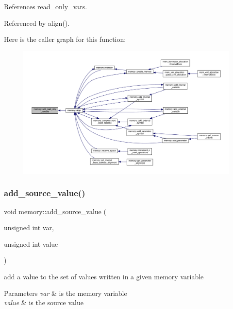 References read\+\_\+only\+\_\+vars.



Referenced by align().

Here is the caller graph for this function\+:
\nopagebreak
\begin{figure}[H]
\begin{center}
\leavevmode
\includegraphics[width=350pt]{d8/d99/classmemory_a626219c7688337cb254b4586af7aaeac_icgraph}
\end{center}
\end{figure}
\mbox{\label{classmemory_a3a39a28a6df6b3815a2fa061bb943ceb}} 
\subsubsection{\texorpdfstring{add\+\_\+source\+\_\+value()}{add\_source\_value()}}
{\footnotesize\ttfamily void memory\+::add\+\_\+source\+\_\+value (\begin{DoxyParamCaption}\item[{unsigned int}]{var,  }\item[{unsigned int}]{value }\end{DoxyParamCaption})}



add a value to the set of values written in a given memory variable 


\begin{DoxyParams}{Parameters}
{\em var} & is the memory variable \\
\hline
{\em value} & is the source value \\
\hline
\end{DoxyParams}


